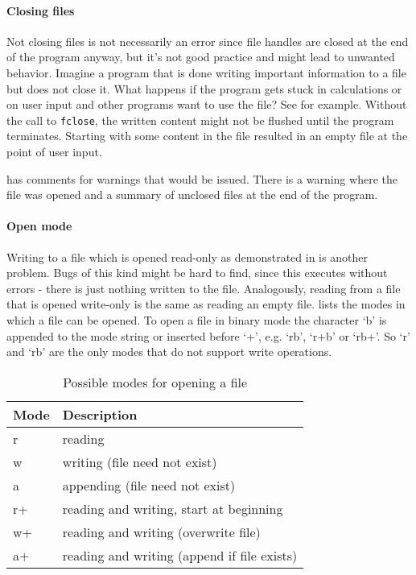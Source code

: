 \paragraph*{Closing files}
Not closing files is not necessarily an error since file handles are closed at the end of the program anyway, but it's not good practice and might lead to unwanted behavior.
Imagine a program that is done writing important information to a file but does not close it. What happens if the program gets stuck in calculations or on user input and other programs want to use the file? See  for example. Without the call to \verb|fclose|, the written content might not be flushed until the program terminates. Starting with some content in the file resulted in an empty file at the point of user input.

 has comments for warnings that would be issued. There is a warning where the file was opened and a summary of unclosed files at the end of the program.

\paragraph*{Open mode}
Writing to a file which is opened read-only as demonstrated in  is another problem. Bugs of this kind might be hard to find, since this executes without errors - there is just nothing written to the file.
Analogously, reading from a file that is opened write-only is the same as reading an empty file.
 lists the modes in which a file can be opened.
To open a file in binary mode the character `b' is appended to the mode string or inserted before `+', e.g. `rb', `r+b' or `rb+'.
So `r' and `rb' are the only modes that do not support write operations.
\begin{table}[ht]
\centering
\begin{tabular}{ll}\hline
Mode & Description\\\hline
r  & reading\\
w  & writing (file need not exist)\\
a  & appending (file need not exist)\\
r+ & reading and writing, start at beginning\\
w+ & reading and writing (overwrite file)\\
a+ & reading and writing (append if file exists)
\end{tabular}
\caption{Possible modes for opening a file}
\label{tbl:open_modes}
\end{table}

